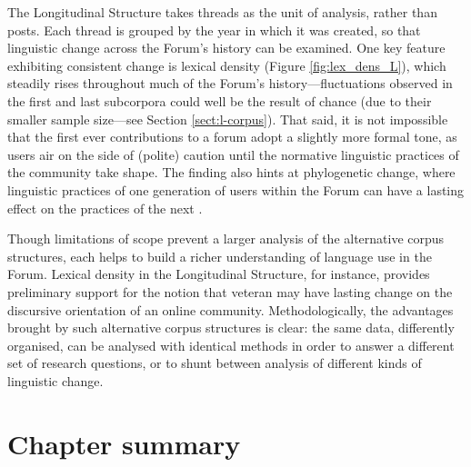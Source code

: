The Longitudinal Structure takes \glspl{thread} as the unit of analysis, rather than \glspl{post}. Each \gls{thread} is grouped by the year in which it was created, so that linguistic change across the \gls{Forum}'s history can be examined. One key feature exhibiting consistent change is lexical density (Figure \ref{fig:lex_dens_L}), which steadily rises throughout much of the \gls{Forum}'s history---fluctuations observed in the first and last subcorpora could well be the result of chance (due to their smaller sample size---see Section \ref{sect:l-corpus}). That said, it is not impossible that the first ever contributions to a \gls{forum} adopt a slightly more formal tone, as users air on the side of (polite) caution until the normative linguistic practices of the community take shape. The finding also hints at phylogenetic change, where linguistic practices of one generation of users within the \gls{Forum} can have a lasting effect on the practices of the next \cite{danescu-niculescu-mizil_no_2013}.

Though limitations of scope prevent a larger analysis of the alternative corpus structures, each helps to build a richer understanding of language use in the \gls{Forum}. Lexical density in the Longitudinal Structure, for instance, provides preliminary support for the notion that veteran  may have lasting change on the discursive orientation of an online community. Methodologically, the advantages brought by such alternative corpus structures is clear: the same data, differently organised, can be analysed with identical methods in order to answer a different set of research questions, or to shunt between analysis of different kinds of linguistic change.

\section{Chapter summary}

